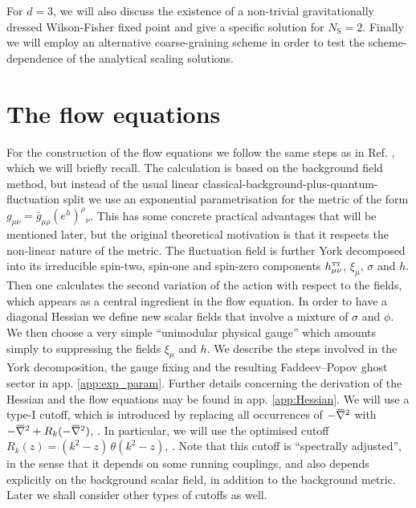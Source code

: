 \documentclass[11pt]{book}
\newcommand{\overbar}[1]{\mkern 1.5mu\overline{\mkern-1.5mu#1\mkern-1.5mu}\mkern 1.5mu}
\newcommand\TTspace{ -1pt }
\newcommand\hTTmunu{ h^{\scriptscriptstyle{\mathrm{T\hspace{\TTspace}T}}}_{\mu\nu} }
\newcommand\NS{ N_{\scriptscriptstyle{\mathrm{S}}} }
\newcommand{\bnabla}{\overbar \nabla}
\numberwithin{equation}{chapter}
\begin{document}
For $d=3$, we will also discuss the existence
of a non-trivial gravitationally dressed Wilson-Fisher fixed point
and give a specific solution for $\NS=2$.
Finally we will employ an alternative coarse-graining scheme
in order to test the scheme-dependence of the analytical scaling solutions.


\section{The flow equations}

For the construction of the flow equations we follow the same steps
as in Ref. \cite{Percacci:2015wwa}, which we will briefly recall.
The calculation is based on the background field method,
but instead of the usual linear classical-background-plus-quantum-fluctuation split we
use an exponential parametrisation for the metric of the form
$g_{\mu\nu} = \bar g_{\mu\rho}(e^h)^\rho{}_\nu$.
This has some concrete practical advantages that will be mentioned later,
but the original theoretical motivation is that it
respects the non-linear nature of the metric.
The fluctuation field is further York decomposed into its irreducible
spin-two, spin-one and spin-zero components $\hTTmunu$,
$\xi_\mu$, $\sigma$ and $h$.
Then one calculates the second variation of the action with
respect to the fields, which appears as a central ingredient
in the flow equation.
In order to have a diagonal Hessian we define new scalar fields
that involve a mixture of $\sigma$ and $\phi$.
We then choose a very simple ``unimodular physical gauge''
which amounts simply to suppressing the fields $\xi_\mu$ and $h$.
We describe the steps involved in the York decomposition, the
gauge fixing and the resulting Faddeev–Popov ghost sector in app. \ref{app:exp_param}.
Further details concerning the derivation of the Hessian and the flow
equations may be found in app. \ref{app:Hessian}.
We will use a type-I cutoff, which is introduced by replacing
all occurrences of $-\bnabla^2$ with $-\bnabla^2+R_k(-\bnabla^2)$,
\cite{Codello:2008vh}.
In particular, we will use the optimised cutoff
$R_k(z)=\left( k^2-z \right) \, \theta \! \left( k^2-z \right)$, \cite{Litim:2001up}.
Note that this cutoff is ``spectrally adjusted'',
in the sense that it depends on some running couplings,
and also depends explicitly on the background scalar field,
in addition to the background metric.
Later we shall consider other types of cutoffs as well.
\end{document}
